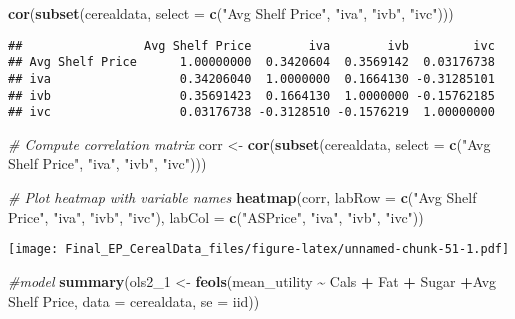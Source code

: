 \documentclass[
]{article}
\newenvironment{Shaded}{\begin{snugshade}}{\end{snugshade}}
\newcommand{\AttributeTok}[1]{\textcolor[rgb]{0.13,0.29,0.53}{#1}}
\newcommand{\CommentTok}[1]{\textcolor[rgb]{0.56,0.35,0.01}{\textit{#1}}}
\newcommand{\FunctionTok}[1]{\textcolor[rgb]{0.13,0.29,0.53}{\textbf{#1}}}
\newcommand{\NormalTok}[1]{#1}
\newcommand{\OtherTok}[1]{\textcolor[rgb]{0.56,0.35,0.01}{#1}}
\newcommand{\SpecialCharTok}[1]{\textcolor[rgb]{0.81,0.36,0.00}{\textbf{#1}}}
\newcommand{\StringTok}[1]{\textcolor[rgb]{0.31,0.60,0.02}{#1}}
\begin{document}
\begin{Shaded}
\begin{Highlighting}[]
\FunctionTok{cor}\NormalTok{(}\FunctionTok{subset}\NormalTok{(cerealdata, }\AttributeTok{select =} \FunctionTok{c}\NormalTok{(}\StringTok{"Avg Shelf Price"}\NormalTok{, }\StringTok{"iva"}\NormalTok{, }\StringTok{"ivb"}\NormalTok{, }\StringTok{"ivc"}\NormalTok{)))}
\end{Highlighting}
\end{Shaded}

\begin{verbatim}
##                 Avg Shelf Price        iva        ivb         ivc
## Avg Shelf Price      1.00000000  0.3420604  0.3569142  0.03176738
## iva                  0.34206040  1.0000000  0.1664130 -0.31285101
## ivb                  0.35691423  0.1664130  1.0000000 -0.15762185
## ivc                  0.03176738 -0.3128510 -0.1576219  1.00000000
\end{verbatim}

\begin{Shaded}
\begin{Highlighting}[]
\CommentTok{\# Compute correlation matrix}
\NormalTok{corr }\OtherTok{\textless{}{-}} \FunctionTok{cor}\NormalTok{(}\FunctionTok{subset}\NormalTok{(cerealdata, }\AttributeTok{select =} \FunctionTok{c}\NormalTok{(}\StringTok{"Avg Shelf Price"}\NormalTok{, }\StringTok{"iva"}\NormalTok{, }\StringTok{"ivb"}\NormalTok{, }\StringTok{"ivc"}\NormalTok{)))}

\CommentTok{\# Plot heatmap with variable names}
\FunctionTok{heatmap}\NormalTok{(corr, }\AttributeTok{labRow =} \FunctionTok{c}\NormalTok{(}\StringTok{"Avg Shelf Price"}\NormalTok{, }\StringTok{"iva"}\NormalTok{, }\StringTok{"ivb"}\NormalTok{, }\StringTok{"ivc"}\NormalTok{), }
        \AttributeTok{labCol =} \FunctionTok{c}\NormalTok{(}\StringTok{"ASPrice"}\NormalTok{, }\StringTok{"iva"}\NormalTok{, }\StringTok{"ivb"}\NormalTok{, }\StringTok{"ivc"}\NormalTok{))}
\end{Highlighting}
\end{Shaded}

\texttt{[image: Final\_EP\_CerealData\_files/figure-latex/unnamed-chunk-51-1.pdf]}

\begin{Shaded}
\begin{Highlighting}[]
\CommentTok{\#model}
\FunctionTok{summary}\NormalTok{(ols2\_1 }\OtherTok{\textless{}{-}} \FunctionTok{feols}\NormalTok{(mean\_utility }\SpecialCharTok{\textasciitilde{}}\NormalTok{ Cals }\SpecialCharTok{+}\NormalTok{ Fat }\SpecialCharTok{+}\NormalTok{ Sugar }\SpecialCharTok{+}\StringTok{\textasciigrave{}}\AttributeTok{Avg Shelf Price}\StringTok{\textasciigrave{}}\NormalTok{, }\AttributeTok{data =}\NormalTok{ cerealdata,}
                     \AttributeTok{se =} \StringTok{\textquotesingle{}iid\textquotesingle{}}\NormalTok{))}
\end{Highlighting}
\end{Shaded}
\end{document}
